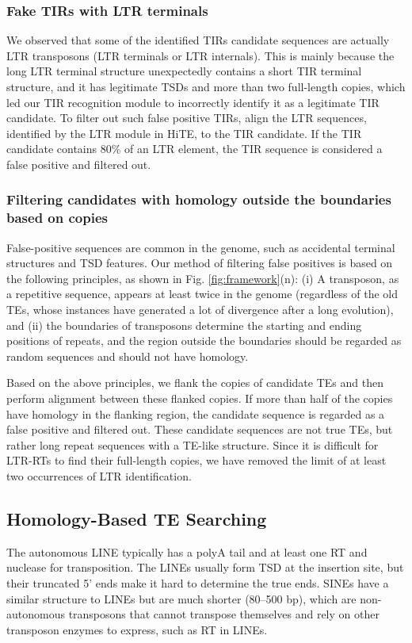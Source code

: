 \documentclass{bmcart}
\begin{document}
\subsubsection*{Fake TIRs with LTR terminals}
We observed that some of the identified TIRs candidate sequences are actually LTR transposons (LTR terminals or LTR internals). This is mainly because the long LTR terminal structure unexpectedly contains a short TIR terminal structure, and it has legitimate TSDs and more than two full-length copies, which led our TIR recognition module to incorrectly identify it as a legitimate TIR candidate. To filter out such false positive TIRs, align the LTR sequences, identified by the LTR module in HiTE, to the TIR candidate. If the TIR candidate contains 80\% of an LTR element, the TIR sequence is considered a false positive and filtered out.

\subsubsection*{Filtering candidates with homology outside the boundaries based on copies}
False-positive sequences are common in the genome, such as accidental terminal structures and TSD features. Our method of filtering false positives is based on the following principles, as shown in Fig. \ref{fig:framework}(n): (i) A transposon, as a repetitive sequence, appears at least twice in the genome (regardless of the old TEs, whose instances have generated a lot of divergence after a long evolution), and (ii) the boundaries of transposons determine the starting and ending positions of repeats, and the region outside the boundaries should be regarded as random sequences and should not have homology.

Based on the above principles, we flank the copies of candidate TEs and then perform alignment between these flanked copies. If more than half of the copies have homology in the flanking region, the candidate sequence is regarded as a false positive and filtered out. These candidate sequences are not true TEs, but rather long repeat sequences with a TE-like structure. Since it is difficult for LTR-RTs to find their full-length copies, we have removed the limit of at least two occurrences of LTR identification.

\subsection*{Homology-Based TE Searching}
The autonomous LINE typically has a polyA tail and at least one RT and nuclease for transposition. The LINEs usually form TSD at the insertion site, but their truncated 5' ends make it hard to determine the true ends. SINEs have a similar structure to LINEs but are much shorter (80–500 bp), which are non-autonomous transposons that cannot transpose themselves and rely on other transposon enzymes to express, such as RT in LINEs.
\end{document}
